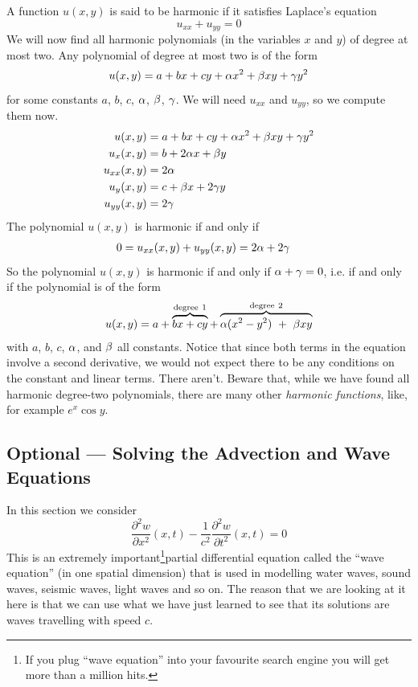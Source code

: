 \begin{eg}[Harmonic]\label{eg_check_PDF_C}
A function $u(x,y)$ is said to be harmonic if it satisfies Laplace's equation
\begin{equation*}
u_{xx} + u_{yy}=0
\end{equation*} 
We will now find all harmonic polynomials (in the variables $x$ and $y$)
of degree at most two. Any polynomial of degree at most two is of the form
\begin{equation*}
u(x,y) = a +bx +cy + \alpha x^2 +\beta xy +\gamma y^2
\end{equation*} 
for some constants $a$, $b$, $c$, $\alpha$, $\beta$, $\gamma$. We will need $u_{xx}$ and $u_{yy}$, so we compute them now.
\begin{align*}
u(x,y) &= a +bx +cy + \alpha x^2 +\beta xy +\gamma y^2 \\
u_x(x,y) &= b + 2\alpha x +\beta y  \\
u_{xx}(x,y) &=  2\alpha  \\
u_y(x,y) &= c + \beta x +2\gamma y  \\
u_{yy}(x,y) &=  2\gamma  
\end{align*}
The polynomial $u(x,y)$ is harmonic if and only if
\begin{align*}
0&= u_{xx}(x,y) + u_{yy}(x,y)
  = 2\alpha+2\gamma
\end{align*}
So the polynomial $u(x,y)$ is harmonic if and only if $\alpha+\gamma=0$, i.e. if and only if the polynomial is of the form
\begin{align*}
u(x,y) = a +\overbrace{bx+cy}^{\rm degree\ 1}
           +\overbrace{\alpha(x^2-y^2)\ +\ \beta xy}^{\rm degree\ 2}
\end{align*}
with $a$, $b$, $c$, $\alpha$, and $\beta$ all constants.
Notice that since both terms in the equation involve a second derivative, we 
would not expect there to be any conditions on the constant and linear terms.
There aren't. Beware that, while we have found all harmonic degree-two polynomials, there are many other \emph{harmonic functions}, like, for example
$e^x\cos y$.
\end{eg}




\subsection{Optional --- Solving the Advection and Wave Equations}\label{sec wave}


In this section we consider 
\begin{equation*}
\frac{\partial^2 w}{\partial x^2}(x,t)
         -\frac{1}{c^2}\frac{\partial^2 w}{\partial t^2}(x,t)=0
\end{equation*}
This is an extremely important\footnote{If you plug ``wave equation'' into your favourite search engine you will get more than a million hits.}partial differential equation called the ``wave equation'' (in one spatial dimension)
that is used in modelling water waves, sound waves, seismic waves,
light waves and so on.
The reason that we are looking at it here is that we can use what we have just
learned to see that its solutions are waves travelling with speed $c$.

